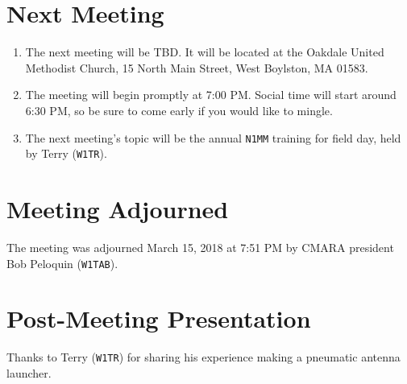\documentclass[10pt,letterpaper]{article}
\begin{document}
\section{Next Meeting}
\begin{enumerate}
  \item The next meeting will be TBD. It will be located at the Oakdale United Methodist Church, 15 North Main Street, West Boylston, MA 01583.
  \item The meeting will begin promptly at 7:00 PM. Social time will start around 6:30 PM, so be sure to come early if you would like to mingle.
  \item The next meeting's topic will be the annual \texttt{N1MM} training for field day, held by Terry (\texttt{W1TR}).
\end{enumerate}

\section{Meeting Adjourned}
The meeting was adjourned March 15, 2018 at 7:51 PM by CMARA president Bob Peloquin (\texttt{W1TAB}).

\section{Post-Meeting Presentation}
Thanks to Terry (\texttt{W1TR}) for sharing his experience making a pneumatic antenna launcher.
\end{document}
